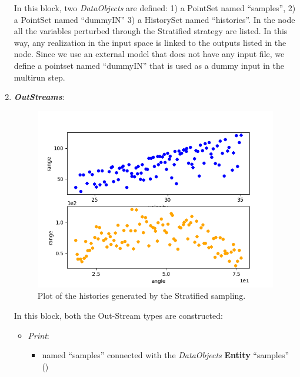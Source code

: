 \begin{enumerate}
  In this block, two \textit{DataObjects} are defined: 1) a PointSet named
      ``samples'', 2) a PointSet named ``dummyIN'' 3) a HistorySet named ``histories''.
  In the  node all the variables perturbed through the Stratified strategy are listed. In this way, any realization in the input space is linked to the outputs listed in  the
   node. Since we use an external model that does not have any input file, we define a pointset named ``dummyIN'' that is used as a dummy input in the multirun step.
   \item \textbf{\textit{OutStreams}}:
 \begin{figure}[h!]
  \centering
  \includegraphics[scale=0.7]{../../tests/framework/user_guide/ForwardSamplingStrategies/gold/RunDir/Stratified/1-historyPlot_scatter-scatter.png}
  \caption{Plot of the histories generated by the Stratified sampling.}
  \label{fig:historiesStratifiedPlotScatter}
 \end{figure}
  In this block, both the Out-Stream types are constructed:
  \begin{itemize}
    \item \textit{Print}:
     \begin{itemize}
       \item named ``samples'' connected with the \textit{DataObjects} \textbf{Entity} ``samples''
                ()

\end{itemize}
\end{itemize}
\end{enumerate}
